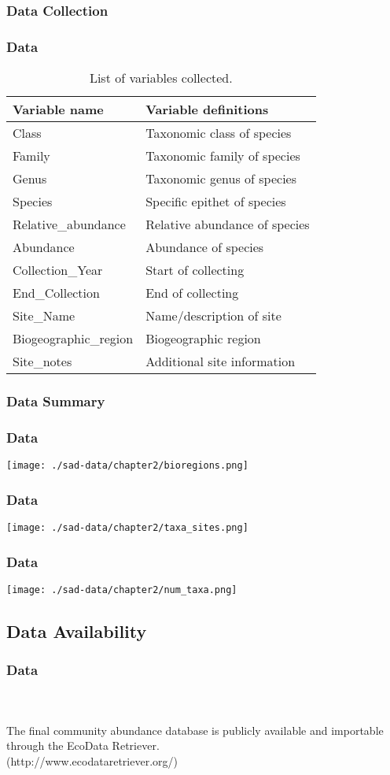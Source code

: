 \documentclass[14pt]{beamer}
\begin{document}
\subsubsection{Data Collection}
\begin{frame}[shrink=30]
\frametitle{Data}
\begin{table}
\begin{tabular}{l|l} 
 Variable name & Variable definitions\\ 
\hline
 Class & Taxonomic class of species \\
 Family & Taxonomic family of species \\
 Genus & Taxonomic genus of species\\
 Species & Specific epithet of species  \\
 Relative\_abundance & Relative abundance of species \\
 Abundance & Abundance of species \\
 Collection\_Year & Start of collecting \\
 End\_Collection & End of collecting \\
 Site\_Name & Name/description of site \\
 Biogeographic\_region & Biogeographic region \\
 Site\_notes & Additional site information \\ 
\end{tabular}
\caption{List of variables collected.}
\end{table}
\end{frame}

\subsubsection{Data Summary}
\begin{frame}{}
\frametitle{Data}
\texttt{[image: ./sad-data/chapter2/bioregions.png]}
\end{frame}

\begin{frame}{}
\frametitle{Data}
\texttt{[image: ./sad-data/chapter2/taxa\_sites.png]}
\end{frame}

\begin{frame}{}
\frametitle{Data}
\texttt{[image: ./sad-data/chapter2/num\_taxa.png]}
\end{frame}

\subsection{Data Availability}
\begin{frame}[t]
\frametitle{Data}
~\\
~\\
The final community abundance database is publicly available and importable through the EcoData Retriever.\\ 
(http://www.ecodataretriever.org/)
\end{frame}
\end{document}
